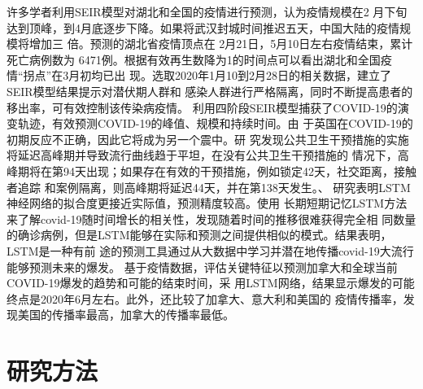 \documentclass[lang=cn,11.9pt,a4paper,cite=authoryear]{elegantpaper}
\begin{document}
许多学者利用SEIR模型对湖北和全国的疫情进行预测，\cite{yang2020modified}认为疫情规模在2
月下旬达到顶峰，到4月底逐步下降。如果将武汉封城时间推迟五天，中国大陆的疫情规模将增加三
倍。\cite{cn6}预测的湖北省疫情顶点在 2月21日，5月10日左右疫情结束，累计死亡病例数为 
6471例。\cite{cn7}根据有效再生数降为1的时间点可以看出湖北和全国疫情“拐点”在3月初均已出
现。\cite{cn8}选取2020年1月10到2月28日的相关数据，建立了SEIR模型结果提示对潜伏期人群和
感染人群进行严格隔离，同时不断提高患者的移出率，可有效控制该传染病疫情。\cite{liu2020modeling}
利用四阶段SEIR模型捕获了COVID-19的演变轨迹，有效预测COVID-19的峰值、规模和持续时间。由
于英国在COVID-19的初期反应不正确，因此它将成为另一个震中。\cite{marimuthu2020covid}研
究发现公共卫生干预措施的实施将延迟高峰期并导致流行曲线趋于平坦，在没有公共卫生干预措施的
情况下，高峰期将在第94天出现；如果存在有效的干预措施，例如锁定42天，社交距离，接触者追踪
和案例隔离，则高峰期将延迟44天，并在第138天发生。\cite{anuradha2020Prediction}、\cite{yan2020an}
研究表明LSTM神经网络的拟合度更接近实际值，预测精度较高。\cite{yudistira2020covid}使用
长期短期记忆LSTM方法来了解covid-19随时间增长的相关性，发现随着时间的推移很难获得完全相
同数量的确诊病例，但是LSTM能够在实际和预测之间提供相似的模式。结果表明，LSTM是一种有前
途的预测工具通过从大数据中学习并潜在地传播covid-19大流行能够预测未来的爆发。\cite{reddy2020time}
基于疫情数据，评估关键特征以预测加拿大和全球当前COVID-19爆发的趋势和可能的结束时间，采
用LSTM网络，结果显示爆发的可能终点是2020年6月左右。此外，还比较了加拿大、意大利和美国的
疫情传播率，发现美国的传播率最高，加拿大的传播率最低。

\section{研究方法}
\end{document}
